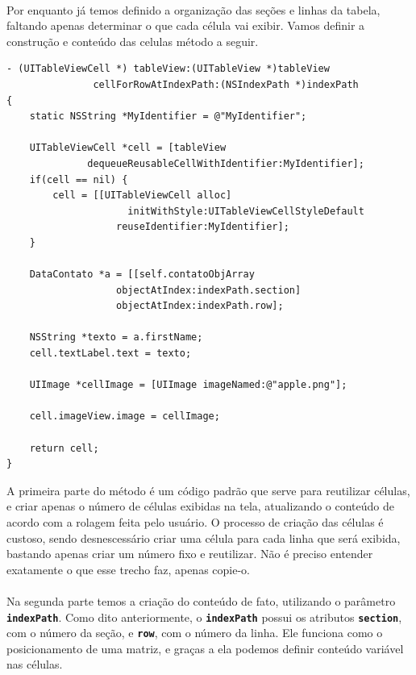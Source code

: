 \documentclass[a4paper,12pt,brazil,doubleside]{book}
\begin{document}
\paragraph{}Por enquanto já temos definido a organização das seções e linhas da tabela, faltando apenas determinar o que cada célula vai exibir. Vamos definir a construção e conteúdo das celulas método a seguir.

\pagebreak

\begin{listing}
\begin{verbatim}
- (UITableViewCell *) tableView:(UITableView *)tableView
               cellForRowAtIndexPath:(NSIndexPath *)indexPath
{
    static NSString *MyIdentifier = @"MyIdentifier";
    
    UITableViewCell *cell = [tableView 
              dequeueReusableCellWithIdentifier:MyIdentifier];
    if(cell == nil) {
        cell = [[UITableViewCell alloc] 
                     initWithStyle:UITableViewCellStyleDefault
                   reuseIdentifier:MyIdentifier];
    }

    DataContato *a = [[self.contatoObjArray
                   objectAtIndex:indexPath.section]
                   objectAtIndex:indexPath.row];

    NSString *texto = a.firstName;
    cell.textLabel.text = texto;
        
    UIImage *cellImage = [UIImage imageNamed:@"apple.png"];
        
    cell.imageView.image = cellImage;
    
    return cell;
}
\end{verbatim}
\end{listing}

A primeira parte do método é um código padrão que serve para reutilizar células, e criar apenas o número de células exibidas na tela, atualizando o conteúdo de acordo com a rolagem feita pelo usuário. O processo de criação das células é custoso, sendo desnescessário criar uma célula para cada linha que será exibida, bastando apenas criar um número fixo e reutilizar. Não é preciso entender exatamente o que esse trecho faz, apenas copie-o.
\paragraph{}Na segunda parte temos a criação do conteúdo de fato, utilizando o parâmetro \texttt{\textbf{indexPath}}. Como dito anteriormente, o \texttt{\textbf{indexPath}} possui os atributos \texttt{\textbf{section}}, com o número da seção, e \texttt{\textbf{row}}, com o número da linha. Ele funciona como o posicionamento de uma matriz, e graças a ela podemos definir conteúdo variável nas células.
\end{document}
